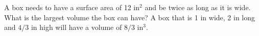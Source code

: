 {A box needs to have a surface area of 12 in$^2$ and be twice as long as it is wide.  What is the largest volume the box can have?
}
{A box that is 1 in wide, 2 in long and $4/3$ in high will have a volume of $8/3\text{ in}^3$.}

